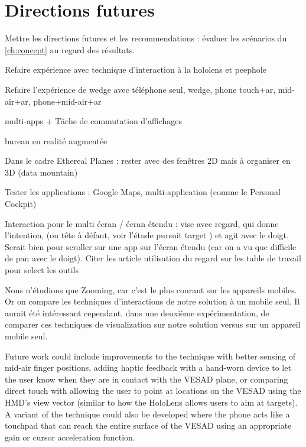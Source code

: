 \section{Directions futures}
\label{sec:future_work}
Mettre les directions futures et les recommendations : évaluer les scénarios du \autoref{ch:concept} au regard des résultats.

Refaire expérience avec technique d'interaction à la hololens et peephole

Refaire l'expérience de wedge avec téléphone seul, wedge, phone touch+ar, mid-air+ar, phone+mid-air+ar

multi-apps + Tâche de commutation d'affichages

bureau en realité augmentée

Dans le cadre Ethereal Planes : rester avec des fenêtres 2D mais à organiser en 3D (data mountain)

Tester les applications : Google Maps, multi-application (comme le Personal Cockpit)

Interaction pour le multi écran / écran étendu : vise avec regard, qui donne l'intention, (ou tête à défaut, voir l'étude pursuit target \citep{Esteves2017}) et agit avec le doigt. Serait bien pour scroller sur une app sur l'écran étendu (car on a vu que difficile de pan avec le doigt). Citer les article utilisation du regard sur les table de travail pour select les outils

Nous n'étudions que Zooming, car c'est le plus courant sur les appareils mobiles. Or on compare les techniques d'interactions de notre solution à un mobile seul. Il aurait été intéressant cependant, dans une deuxième expérimentation, de comparer ces techniques de visualization sur notre solution versus sur un appareil mobile seul.

Future work could include improvements to the  technique with better sensing of mid-air finger positions, adding haptic feedback
with a hand-worn device to let the user know when they are in contact with the VESAD plane, or comparing direct touch with allowing the user to point at locations on the VESAD using the HMD's view vector (similar to how the HoloLens allows users to aim at targets). A variant of the  technique could also be developed where the phone acts like a touchpad that can reach the entire surface of the VESAD using an appropriate gain or cursor acceleration function.



